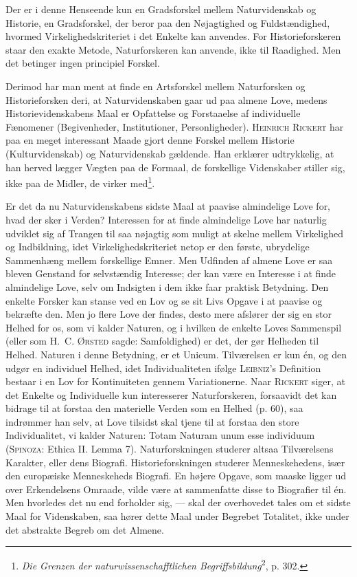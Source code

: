 \documentclass[12pt]{article}
\newcommand{\opage}[1]{\marginnote{\footnotesize\textit{[#1]}}}
\begin{document}
Der er i denne Henseende kun en Gradsforskel mellem Naturvidenskab og
Historie, en Gradsforskel, der beror paa den Nøjagtighed og Fuldstændighed,
hvormed Virkelighedskriteriet i det Enkelte kan anvendes. For Historieforskeren
staar den exakte Metode, Naturforskeren kan anvende, ikke til Raadighed. Men det
betinger ingen principiel Forskel.

Derimod har man ment at finde en Artsforskel mellem Naturforsken og
Historieforsken deri, at Naturvidenskaben gaar ud paa almene Love, medens
Historievidenskabens Maal er Opfattelse og Forstaaelse af individuelle Fænomener
(Begivenheder, Institutioner, Personligheder). \textsc{Heinrich Rickert} har paa en
meget interessant Maade gjort denne Forskel mellem Historie (Kulturvidenskab) og
Naturvidenskab gældende. Han erklærer udtrykkelig, at han herved lægger Vægten paa
de Formaal, de forskellige Videnskaber stiller sig, ikke paa de Midler, de virker
med\footnote{%
\textit{Die Grenzen der naturwissenschafftlichen
Begriffsbildung}\textsuperscript{2}, p. 302.}.

Er det da nu Naturvidenskabens sidste Maal at paavise almindelige Love for,
hvad der sker i Verden? Interessen for at finde almindelige Love har naturlig
udviklet sig af Trangen til saa nøjagtig som muligt at skelne mellem Virkelighed
og Indbildning, idet Virkelighedskriteriet netop er den første, ubrydelige
Sammenhæng mellem forskellige Emner. Men Udfinden af almene Love er saa bleven
Genstand for selvstændig Interesse; der kan være en Interesse i at finde almindelige
\setcounter{footnote}{0}%
\opage{65}Love, selv om Indsigten i dem ikke faar praktisk Betydning. Den enkelte Forsker
kan stanse ved en Lov og se sit Livs Opgave i at paavise og bekræfte den. Men jo
flere Love der findes, desto mere afslører der sig en stor Helhed for os, som vi
kalder Naturen, og i hvilken de enkelte Loves Sammenspil (eller som \textsc{H.~C.
Ørsted} sagde: Samfoldighed) er det, der gør Helheden til Helhed. Naturen i denne
Betydning, er et Unicum. Tilværelsen er kun én, og den udgør en individuel Helhed,
idet Individualiteten ifølge \textsc{Leibniz}'s Definition bestaar i en Lov for
Kontinuiteten gennem Variationerne. Naar \textsc{Rickert} siger, at det Enkelte og
Individuelle kun interesserer Naturforskeren, forsaavidt det kan bidrage til at
forstaa den materielle Verden som en Helhed (p. 60), saa indrømmer han selv, at
Love tilsidst skal tjene til at forstaa den store Individualitet, vi kalder
Naturen: Totam Naturam unum esse individuum (\textsc{Spinoza}: Ethica II. Lemma 7).
Naturforskningen studerer altsaa Tilværelsens Karakter, eller dens Biografi.
Historieforskningen studerer Menneskehedens, især den europæiske Menneskeheds
Biografi. En højere Opgave, som maaske ligger ud over Erkendelsens Omraade, vilde
være at sammenfatte disse to Biografier til én. Men hvorledes det nu end forholder
sig, --- skal der overhovedet tales om et sidste Maal for Videnskaben, saa hører
dette Maal under Begrebet Totalitet, ikke under det abstrakte Begreb om det
Almene.
\end{document}
